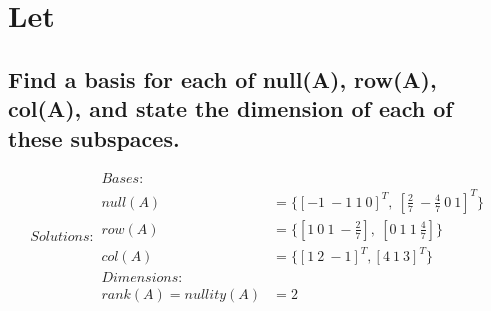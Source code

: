 \documentclass[../main.tex]{subfiles}
\begin{document}
\section[Problem 6]{Let }
\subsection{Find a basis for each of null(A), row(A), col(A), and state the dimension of each of these subspaces.}
\begin{equation*}
        \boxed{ Solutions:
                \begin{aligned}
                        Bases:                                                                                    \\
                        null(A)              & = \{[-1 \ -1 \ 1\ 0]^T,\  [\frac{2}{7} \ -\frac{4}{7} \ 0 \ 1]^T\} \\
                        row(A)               & = \{[1 \ 0 \ 1 \ -\frac{2}{7}],\ [0 \ 1 \ 1 \ \frac{4}{7}]\}       \\
                        col(A)               & = \{[1 \ 2 \ -1]^T, [4 \ 1 \ 3]^T\}                                \\
                        Dimensions:                                                                               \\
                        rank(A) = nullity(A) & = 2
                \end{aligned}}
\end{equation*}
\end{document}
